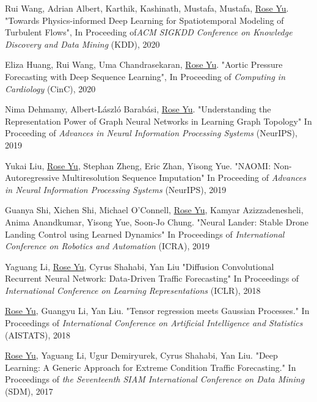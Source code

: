 \documentclass[margin,line]{res}
\begin{document}
\begin{resume}
\begin{enumerate}[label={[C\arabic*]},  leftmargin=*]
\item Rui Wang, Adrian Albert,  Karthik, Kashinath, Mustafa, Mustafa,  \underline{Rose Yu}. "Towards Physics-informed Deep Learning for Spatiotemporal Modeling of Turbulent Flows", In  Proceeding of\textit{ACM SIGKDD Conference on Knowledge Discovery and Data Mining} (KDD), 2020

\item Eliza Huang, Rui Wang, Uma Chandrasekaran, \underline{Rose Yu}.  "Aortic Pressure Forecasting with Deep Sequence Learning", In  Proceeding of  \textit{Computing in Cardiology} (CinC), 2020 

\item Nima Dehmamy, Albert-L\'aszl\'o Barab\'asi, \underline{Rose Yu}.  "Understanding the Representation Power of Graph Neural Networks in Learning Graph Topology" In Proceeding of  \textit{Advances in Neural Information Processing Systems} (NeurIPS), 2019
 
 
\item  Yukai Liu, \underline{Rose Yu}, Stephan Zheng, Eric Zhan, Yisong Yue. "NAOMI: Non-Autoregressive Multiresolution Sequence Imputation" In  Proceeding of  \textit{Advances in Neural Information Processing Systems} (NeurIPS), 2019


\item Guanya Shi, Xichen Shi, Michael O'Connell, \underline{Rose Yu}, Kamyar Azizzadenesheli, Anima Anandkumar, Yisong Yue, Soon-Jo Chung. "Neural Lander: Stable Drone Landing Control using Learned Dynamics" In  Proceedings  of \textit{International Conference on Robotics and Automation} (ICRA), 2019

\item 	Yaguang Li,  \underline{Rose Yu}, Cyrus Shahabi, Yan Liu
	"Diffusion Convolutional Recurrent Neural Network: Data-Driven Traffic Forecasting" In  Proceedings  of   \textit{International Conference on Learning Representations
	}(ICLR), 2018 
	
\item  \underline{Rose Yu}, Guangyu Li, Yan Liu. "Tensor regression meets Gaussian Processes." In Proceedings  of   \textit{International Conference on Artificial Intelligence and Statistics} (AISTATS), 2018 

\item \underline{Rose Yu}, Yaguang Li, Ugur Demiryurek, Cyrus Shahabi, Yan Liu. "Deep Learning: A Generic Approach for Extreme Condition Traffic Forecasting." In   Proceedings  of  \textit{the Seventeenth SIAM International Conference on Data Mining }(SDM), 2017


\end{enumerate}
\end{resume}
\end{document}
